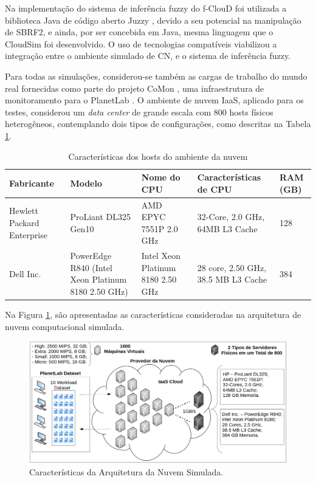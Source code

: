 \documentclass[tcc,capa]{texufpel}
\begin{document}
Na implementação do sistema de inferência fuzzy do f-ClouD foi utilizada a biblioteca Java de código aberto Juzzy \cite{Juzzy2013}, devido a seu potencial na manipulação de SBRF2, e ainda, por ser concebida em Java, mesma linguagem que o CloudSim foi desenvolvido. O uso de tecnologias compatíveis viabilizou a integração entre o ambiente simulado de CN, e o sistema de inferência fuzzy.

Para todas as simulações, considerou-se também as cargas de trabalho do mundo real fornecidas como parte do projeto CoMon \cite{CoMon2006}, uma infraestrutura de monitoramento para o PlanetLab \cite{chun2003planetlab}. O ambiente de nuvem IaaS, aplicado para os testes, considerou um \textit{data center} de grande escala com 800 hosts físicos heterogêneos, contemplando dois tipos de configurações, como descritas na Tabela \ref{lblConfAmbiente}.

\begin{table}[h]
\centering
{}
\begin{tabular}{|p{1.7cm}||p{3.5cm}|p{2.8cm}|p{2.8cm}|p{2cm}|} \hline
\textbf{Fabricante} & \textbf{Modelo} & \textbf{Nome do CPU} & \textbf{Características de CPU} & \textbf{RAM (GB)} \\ \hline \hline
Hewlett Packard Enterprise & ProLiant DL325 Gen10 & AMD EPYC 7551P 2.0 GHz & 32-Core, 2.0 GHz, 64MB L3 Cache &  128 \\ \hline
Dell Inc. & PowerEdge R840 (Intel Xeon Platinum 8180 2.50 GHz) & Intel Xeon Platinum 8180 2.50 GHz & 28 core, 2.50 GHz, 38.5 MB L3 Cache & 384 \\ \hline
\end{tabular}
\caption{Características dos hosts do ambiente da nuvem}
\label{lblConfAmbiente}
\end{table}

\newpage

Na Figura \ref{Caracteriscas_Cloud}, são apresentadas as características consideradas na arquitetura de nuvem computacional simulada.

\begin{figure}[h]
\centering
\includegraphics[scale=0.4]{images/caracteriscas_cloud_ptbr2.png} 
\caption{Características da Arquitetura da Nuvem Simulada.}
\label{Caracteriscas_Cloud}
\end{figure}
\end{document}
